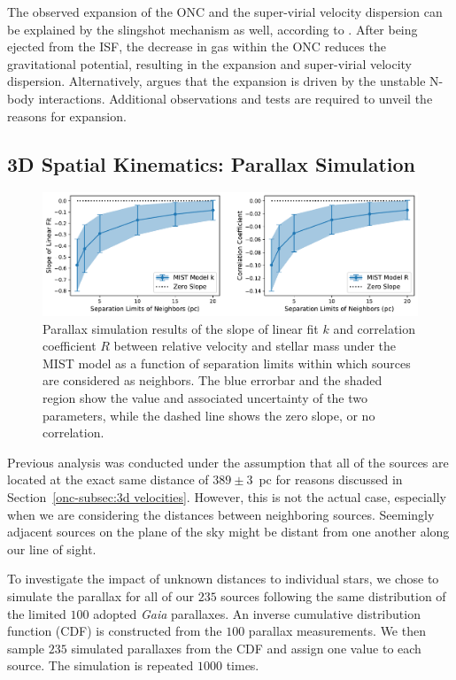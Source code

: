 \documentclass[12pt]{ucsddissertation}
\begin{document}
\begin{CJK*}{UTF8}{gbsn}
The observed expansion of the ONC \citep{Kounkel-2022} and the super-virial velocity dispersion can be explained by the slingshot mechanism as well, according to \citet{Matus-2023}. After being ejected from the ISF, the decrease in gas within the ONC reduces the gravitational potential, resulting in the expansion and super-virial velocity dispersion. Alternatively, \citet{Kounkel-2022} argues that the expansion is driven by the unstable N-body interactions. Additional observations and tests are required to unveil the reasons for expansion.


\subsection{3D Spatial Kinematics: Parallax Simulation}
\label{onc-subsec:parallax simulation}
\begin{figure}[htb!]
    \centering
    \includegraphics[width=\linewidth]{figures/chapter1/slope_vs_sep-simulate_dist.pdf}
    \caption[Parallax simulation results of the negative correlation between relative velocity and stellar mass]{Parallax simulation results of the slope of linear fit $k$ and correlation coefficient $R$ between relative velocity and stellar mass under the MIST model as a function of separation limits within which sources are considered as neighbors. The blue errorbar and the shaded region show the value and associated uncertainty of the two parameters, while the dashed line shows the zero slope, or no correlation.}
    \label{fig:simulate k R}
\end{figure}


Previous analysis was conducted under the assumption that all of the sources are located at the exact same distance of $389\pm3$~pc for reasons discussed in Section~\ref{onc-subsec:3d velocities}. However, this is not the actual case, especially when we are considering the distances between neighboring sources. Seemingly adjacent sources on the plane of the sky might be distant from one another along our line of sight.

To investigate the impact of unknown distances to individual stars, we chose to simulate the parallax for all of our $235$ sources following the same distribution of the limited $100$ adopted \textit{Gaia} parallaxes. An inverse cumulative distribution function (CDF) is constructed from the $100$ parallax measurements. We then sample $235$ simulated parallaxes from the CDF and assign one value to each source. The simulation is repeated $1000$ times.


\end{CJK*}
\end{document}
